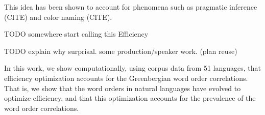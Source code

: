 \documentclass[9pt,twocolumn,twoside,lineno]{pnas-new}
\begin{document}
This idea has been shown to account for phenomena such as pragmatic inference (CITE) and color naming (CITE).

TODO somewhere start calling this Efficiency

TODO explain why surprisal. some production/speaker work. (plan reuse)


In this work, we show computationally, using corpus data from 51 languages, that efficiency optimization accounts for the Greenbergian word order correlations.
That is, we show that the word orders in natural languages have evolved to optimize efficiency, and that this optimization accounts for the prevalence of the word order correlations. %







%
%
%
\end{document}
